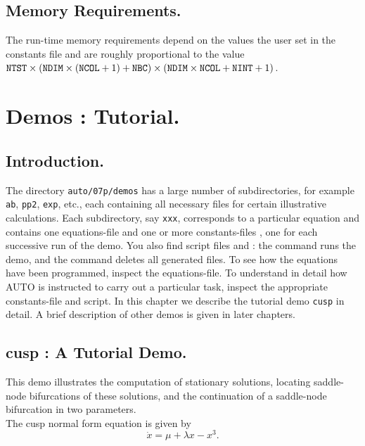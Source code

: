 \documentclass[12pt]{report}
\begin{document}
\section{ Memory Requirements.} \label{sec:Memory_requirements}
The run-time memory requirements depend on the values the user set in
the constants file and are roughly proportional to the value
${\tt NTST}\times({\tt NDIM}\times({\tt NCOL}+1)+{\tt NBC})\times
({\tt NDIM}\times{\tt NCOL}+{\tt NINT}+1)$.

\chapter{ \AUTO Demos : Tutorial.} \label{ch:Demos:_Tutorial}
\newpage
\section{ Introduction.} \label{sec:Tutorial_Introduction}
The directory {\tt auto/07p/demos} has a large number of subdirectories,
for example {\tt ab}, {\tt pp2}, {\tt exp}, etc.,
each containing all necessary files for certain illustrative calculations.
Each subdirectory, say {\tt xxx}, corresponds to a particular equation
and contains one equations-file 
and one or more constants-files , 
one for each successive run of the demo.
You also find \python script files  and
: the command  runs the demo,
and the command  deletes all generated files.
To see how the equations have been programmed, inspect the equations-file. 
To understand in detail how {\cal AUTO} is instructed to carry out a 
particular task, inspect the appropriate constants-file and \python
script.
In this chapter we describe the tutorial demo {\tt cusp} in detail.
A brief description of other demos is given in later chapters.


\section{ cusp : A Tutorial Demo.} \label{sec:Demos_cusp}
This demo illustrates the computation of 
stationary solutions, locating saddle-node bifurcations of these
solutions, and the continuation of a saddle-node bifurcation in two
parameters.\\
The cusp normal form equation is given by
\begin{equation}
  \dot x = \mu + \lambda x - x^3.
\end{equation}
\end{document}
